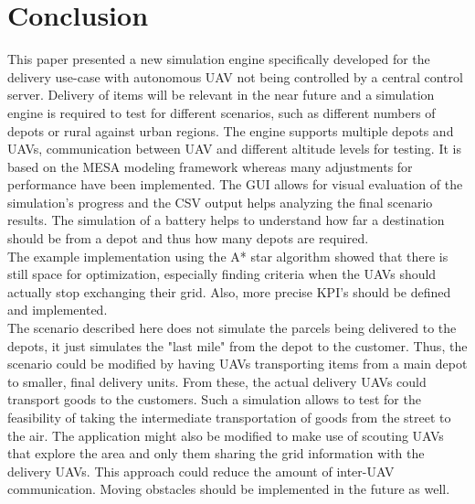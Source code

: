 \section{Conclusion}\label{sec:conclusion}
This paper presented a new simulation engine specifically developed for the delivery use-case with autonomous UAV not being controlled by a central control server. Delivery of items will be relevant in the near future and a simulation engine is required to test for different scenarios, such as different numbers of depots or rural against urban regions. The engine supports multiple depots and UAVs, communication between UAV and different altitude levels for testing. It is based on the MESA modeling framework whereas many adjustments for performance have been implemented. The GUI allows for visual evaluation of the simulation's progress and the CSV output helps analyzing the final scenario results. The simulation of a battery helps to understand how far a destination should be from a depot and thus how many depots are required. \\
The example implementation using the A* star algorithm showed that there is still space for optimization, especially finding criteria when the UAVs should actually stop exchanging their grid. Also, more precise KPI's should be defined and implemented.\\
The scenario described here does not simulate the parcels being delivered to the depots, it just simulates the "last mile" from the depot to the customer. Thus, the scenario could be modified by having UAVs transporting items from a main depot to smaller, final delivery units. From these, the actual delivery UAVs could transport goods to the customers. Such a simulation allows to test for the feasibility of taking the intermediate transportation of goods from the street to the air. The application might also be modified to make use of scouting UAVs that explore the area and only them sharing the grid information with the delivery UAVs. This approach could reduce the amount of inter-UAV communication. Moving obstacles should be implemented in the future as well.
